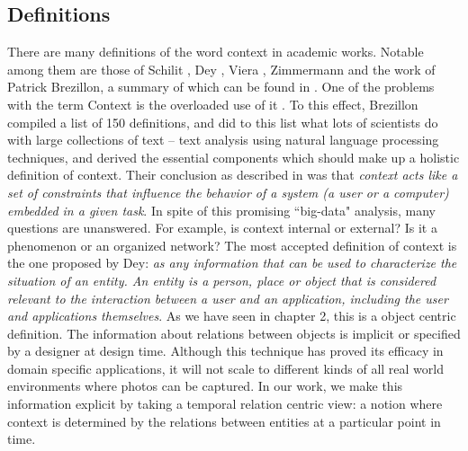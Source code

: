 \subsection{Definitions}
There are many definitions of the word context in academic works. Notable among them are those of Schilit \cite{schilit1994context}, Dey \cite{dey2001understanding}, Viera \cite{vieira2011designing}, Zimmermann \cite{zimmermann2007operational} and the work of Patrick Brezillon, a summary of which can be found in \cite{mostefaoui2004context}. One of the problems with the term Context is the overloaded use of it \cite{henricksen2002modeling}. To this effect, Brezillon compiled a list of 150 definitions, and did to this list what lots of scientists do with large collections of text -- text analysis using natural language processing techniques, and derived the essential components which should make up a holistic definition of context. Their conclusion as described in \cite{bazire2005understanding} was that \textit{context acts like a set of constraints that influence the behavior of a system (a user or a computer) embedded in a given task}. In spite of this promising ``big-data" analysis, many questions are unanswered. For example, is context internal or external? Is it a phenomenon or an organized network? The most accepted definition of context is the one proposed by Dey: \textit{as any information that can be used to characterize the situation of an entity. An entity is a person, place or object that is considered relevant to the interaction between a user and an application, including the user and applications themselves}. As we have seen in chapter 2, this is a object centric definition. The information about relations between objects is implicit or specified by a designer at design time. Although this technique has proved its efficacy in domain specific applications, it will not scale to different kinds of all real world environments where photos can be captured. In our work, we make this information explicit by taking a temporal relation centric view: a notion where context is determined by the relations between entities at a particular point in time.

